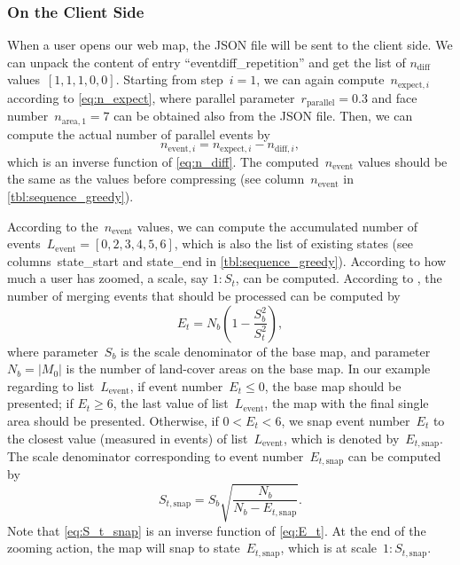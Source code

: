 \documentclass[ijgi,article,submit,moreauthors,pdftex]{Definitions/mdpi}
\begin{document}
\subsubsection{On the Client Side}
\label{sec:snap_client}


When a user opens our web map,
the JSON file will be sent to the client side.
We can unpack the content of entry ``eventdiff\_repetition'' and 
get the list of $n_\mathrm{diff}$ values~$[1, 1, 1, 0, 0]$.
Starting from step~$i=1$,
we can again compute~$n_{\mathrm{expect},i}$ according to \eq\ref{eq:n_expect},
where parallel parameter~$r_\mathrm{parallel}=0.3$ 
and face number~$n_{\mathrm{area},1} = 7$
can be obtained also from the JSON file.
Then, we can compute the actual number of parallel events by
\begin{equation*}
\label{eq:n_event_step}
n_{\mathrm{event},i} = n_{\mathrm{expect},i} - n_{\mathrm{diff},i},
\end{equation*}
which is an inverse function of \eq\ref{eq:n_diff}.
The computed~$n_\mathrm{event}$ values 
should be the same as the values before compressing
(see column~$n_\mathrm{event}$ in \tbl\ref{tbl:sequence_greedy}).

According to the~$n_\mathrm{event}$ values,
we can compute the accumulated number of events~$L_\mathrm{event} = 
[0, 2, 3, 4, 5, 6]$,
which is also the list of existing states
(see columns~state\_start and state\_end in \tbl\ref{tbl:sequence_greedy}).
According to how much a user has zoomed,
a scale, say $1:S_t$, can be computed.
According to \citet{Huang2016Webmap},
the number of merging events that should be processed can be computed by
\begin{equation}
\label{eq:E_t}
E_t = N_b \left(1-\frac{S^2_b}{S^2_t}\right),
\end{equation}
where parameter~$S_b$ is the scale denominator of the base map,
and parameter~$N_b = |M_0|$ is the number of land-cover areas on the base map.
In our example regarding to list~$L_\mathrm{event}$,
if event number~$E_t \le 0$, the base map should be presented;
if $E_t \ge 6$, the last value of list~$L_\mathrm{event}$,
the map with the final single area should be presented.
Otherwise, if $0<E_t < 6$, we snap event number~$E_t$ 
to the closest value (measured in events) of list~$L_\mathrm{event}$,
which is denoted by~$E_{t,\mathrm{snap}}$.
The scale denominator corresponding to event number~$E_{t,\mathrm{snap}}$
can be computed by 
\begin{equation}
\label{eq:S_t_snap}
S_{t,\mathrm{snap}} = S_b \sqrt{\frac{N_b}{N_b-E_{t,\mathrm{snap}}}}.
\end{equation}
Note that \eq\ref{eq:S_t_snap} is an inverse function of \eq\ref{eq:E_t}.
At the end of the zooming action, 
the map will snap to state~$E_{t,\mathrm{snap}}$,
which is at scale~$1:S_{t,\mathrm{snap}}$.
\end{document}
